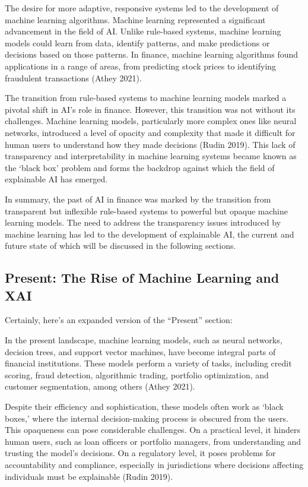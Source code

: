 \documentclass[
  letterpaper,
  DIV=11,
  numbers=noendperiod]{scrartcl}
\begin{document}
The desire for more adaptive, responsive systems led to the development
of machine learning algorithms. Machine learning represented a
significant advancement in the field of AI. Unlike rule-based systems,
machine learning models could learn from data, identify patterns, and
make predictions or decisions based on those patterns. In finance,
machine learning algorithms found applications in a range of areas, from
predicting stock prices to identifying fraudulent transactions (Athey
2021).

The transition from rule-based systems to machine learning models marked
a pivotal shift in AI's role in finance. However, this transition was
not without its challenges. Machine learning models, particularly more
complex ones like neural networks, introduced a level of opacity and
complexity that made it difficult for human users to understand how they
made decisions (Rudin 2019). This lack of transparency and
interpretability in machine learning systems became known as the `black
box' problem and forms the backdrop against which the field of
explainable AI has emerged.

In summary, the past of AI in finance was marked by the transition from
transparent but inflexible rule-based systems to powerful but opaque
machine learning models. The need to address the transparency issues
introduced by machine learning has led to the development of explainable
AI, the current and future state of which will be discussed in the
following sections.

\hypertarget{present-the-rise-of-machine-learning-and-xai}{%
\subsection{Present: The Rise of Machine Learning and
XAI}\label{present-the-rise-of-machine-learning-and-xai}}

Certainly, here's an expanded version of the ``Present'' section:

In the present landscape, machine learning models, such as neural
networks, decision trees, and support vector machines, have become
integral parts of financial institutions. These models perform a variety
of tasks, including credit scoring, fraud detection, algorithmic
trading, portfolio optimization, and customer segmentation, among others
(Athey 2021).

Despite their efficiency and sophistication, these models often work as
`black boxes,' where the internal decision-making process is obscured
from the users. This opaqueness can pose considerable challenges. On a
practical level, it hinders human users, such as loan officers or
portfolio managers, from understanding and trusting the model's
decisions. On a regulatory level, it poses problems for accountability
and compliance, especially in jurisdictions where decisions affecting
individuals must be explainable (Rudin 2019).
\end{document}
